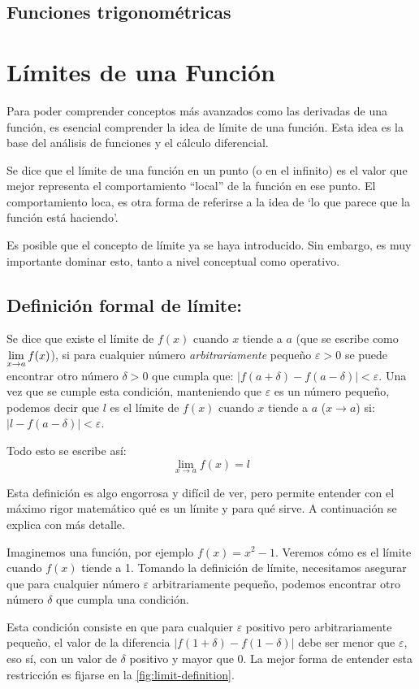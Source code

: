\documentclass[sans]{apuntes}
\begin{document}
\subsection{Funciones trigonométricas}
\par {}

\section{Límites de una Función}
Para poder comprender conceptos más avanzados como las derivadas de una función, es esencial comprender la idea de límite de una función. Esta idea es la base del análisis de funciones y el cálculo diferencial.
\par Se dice que el límite de una función en un punto (o en el infinito) es el valor que mejor representa el comportamiento ``local'' de la función en ese punto. El comportamiento loca, es otra forma de referirse a la idea de `lo que parece que la función está haciendo'.
\par Es posible que el concepto de límite ya se haya introducido. Sin embargo, es muy importante dominar esto, tanto a nivel conceptual como operativo.

\subsection{Definición formal de límite:}
Se dice que existe el límite de $f(x)$ cuando $x$ tiende a $a$ (que se escribe como $\displaystyle\lim_{x \to a} f(x)$), si para cualquier número \emph{arbitrariamente} pequeño $\varepsilon > 0$ se puede encontrar otro número $\delta > 0$ que cumpla que: $\left|f(a + \delta) - f(a - \delta)\right| < \varepsilon$. Una vez que se cumple esta condición, manteniendo que $\varepsilon$ es un número pequeño, podemos decir que $l$ es el límite de $f(x)$ cuando $x$ tiende a $a$ ($x \to a$) si: $\left|l - f(a - \delta)\right| < \varepsilon$.
\par Todo esto se escribe así:
\[\lim_{x\to a}f(x) = l\]
\par Esta definición es algo engorrosa y difícil de ver, pero permite entender con el máximo rigor matemático qué es un límite y para qué sirve. A continuación se explica con más detalle.
\par Imaginemos una función, por ejemplo $f(x) = x^2 - 1$. Veremos cómo es el límite cuando $f(x)$ tiende a 1. Tomando la definición de límite, necesitamos asegurar que para cualquier número $\varepsilon$ arbitrariamente pequeño, podemos encontrar otro número $\delta$ que cumpla una condición.
\par Esta condición consiste en que para cualquier $\varepsilon$ positivo pero arbitrariamente pequeño, el valor de la diferencia $\left|f(1 + \delta) - f(1 - \delta)\right|$ debe ser menor que $\varepsilon$, eso sí, con un valor de $\delta$ positivo y mayor que 0. La mejor forma de entender esta restricción es fijarse en la \autoref{fig:limit-definition}.
\end{document}
